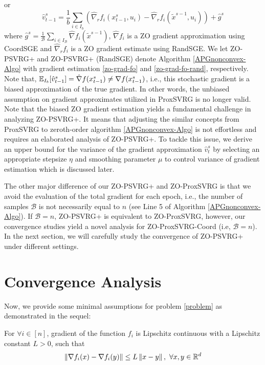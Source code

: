 or 
\begin{equation}\label{zo-grad-fo-rand}
{\hat{v}}_{t-1}^s = \frac{1}{b} \sum_{i\in I_b}\left(\hat{\nabla}_r f_{i}(x_{t-1}^s, u_i)-\hat{\nabla}_r f_{i}(\tilde{x}^{s-1}, u_i)\right)+\hat{g}^s
\end{equation}
where $\hat{g}^s= \frac{1}{\mathcal{B}}\sum_{i\in I_{\mathcal{B}}}\hat{\nabla} f_{i}(\tilde{x}^{s-1})$,   $\hat{\nabla} f_{i}$ is a ZO gradient approximation using CoordSGE and $\hat{\nabla}_r f_{i}$ is a ZO gradient estimate using RandSGE.  We let ZO-PSVRG+ and ZO-PSVRG+ (RandSGE) denote Algorithm \ref{APGnonconvex-Algo} with gradient estimation \eqref{zo-grad-fo} and 
\eqref{zo-grad-fo-rand}, respectively. 
Note that, $\mathbb{E}_{I_b}[\hat{v}_{t-1}^s] = \hat{\nabla} f(x_{t-1}^s) \neq {\nabla} f(x_{t-1}^s)$, i.e., this stochastic gradient is a biased approximation of the true gradient.
In other words, the unbiased assumption on gradient approximates utilized in ProxSVRG \cite{reddi2016proximal,li2018simple} is no longer valid. Note that the biased ZO gradient estimation yields a fundamental challenge in analyzing ZO-PSVRG+. It means that adjusting the similar concepts from ProxSVRG to zeroth-order algorithm \ref{APGnonconvex-Algo} is not effortless and requires an elaborated analysis of ZO-PSVRG+. To tackle this issue, we derive an upper bound for the variance of the gradient approximation $\hat{v}_t^s$ by selecting an appropriate stepsize $\eta$ and smoothing parameter $\mu$ to control
variance of gradient estimation which is discussed later.

The other major difference of our ZO-PSVRG+  and ZO-ProxSVRG is that we avoid the evaluation of the total gradient for each epoch, i.e., the number of samples $\mathcal{B}$ is not necessarily equal to $n$ (see Line 5 of Algorithm \ref{APGnonconvex-Algo}).  If $\mathcal{B} = n$, ZO-PSVRG+ is equivalent to ZO-ProxSVRG, however, our convergence studies yield a novel analysis for ZO-ProxSVRG-Coord (i.e, $\mathcal{B} = n$). In the next section, we will carefully study the convergence of ZO-PSVRG+ under different settings.

\section{Convergence Analysis}
Now, we provide some
minimal assumptions for problem \eqref{problem} as demonstrated in the sequel:
\begin{assumption}\label{Lip-Zoo}
For $\forall i\in [n]$, gradient of the function $f_i$ is Lipschitz continuous with a Lipschitz constant $L > 0$, such that 
\[
\left\lVert\nabla f_i(x) - \nabla f_i(y)\right\rVert\leq L \left\lVert x-y\right\rVert,\,\,\forall x,y\in\mathbb{R}^d
\]
\end{assumption}

